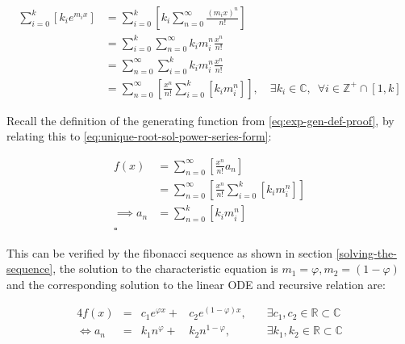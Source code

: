 \documentclass[11pt]{article}
\begin{document}
\begin{enumerate}
\begin{align}
    \sum^{k}_{i= 0}   {\left[{ k_i e^{m_i x}  }\right]}  &= \sum^{k}_{i= 0}   {\left[{ k_i \sum^{\infty}_{n= 0}   \frac{{\left({ m_i x }\right)}^n}{n!}  }\right]}  \nonumber \\
							 &= \sum^{k}_{i= 0}  \sum^{\infty}_{n= 0}   k_i m_i^n \frac{x^n}{n!} \nonumber\\
							 &=    \sum^{\infty}_{n= 0} \sum^{k}_{i= 0}   k_i m_i^n \frac{x^n}{n!} \nonumber \\
							 &= \sum^{\infty}_{n= 0} {\left[{ \frac{x^n}{n!}  \sum^{k}_{i=0}   {\left[{ k_im^n_i }\right]}  }\right]}, \quad \exists k_i \in \mathbb{C}, \enspace \forall i \in \mathbb{Z}^+\cap {\left[{ 1, k }\right]}     \label{eq:unique-root-sol-power-series-form}
\end{align}

Recall the definition of the generating function from \ref{eq:exp-gen-def-proof}, by relating this to \eqref{eq:unique-root-sol-power-series-form}:

\begin{align}
    f{\left({ x }\right)} &= \sum^{\infty}_{n= 0}   {\left[{  \frac{x^n}{n!} a_n }\right]} \nonumber \\
&= \sum^{\infty}_{n= 0} {\left[{ \frac{x^n}{n!}  \sum^{k}_{i=0}   {\left[{ k_im^n_i }\right]}  }\right]}  \nonumber \\
      \implies  a_n &= \sum^{k}_{n= 0} {\left[{ k_im_i^n }\right]}     \nonumber \\ \nonumber
\square
\end{align}

This can be verified by the fibonacci sequence as shown in section \ref{solving-the-sequence}, the solution to the characteristic equation is \(m_1 = \varphi, m_2 = {\left({ 1-\varphi }\right)}\) and the corresponding solution to the linear ODE and recursive relation are:

\begin{alignat}{4}
    f{\left({ x }\right)} &= &c_1 e^{\varphi x} +  &c_2 e^{{\left({ 1-\varphi }\right)} x}, \quad &\exists c_1, c_2 \in \mathbb{R} \subset \mathbb{C} \nonumber \\
    \iff  a_n &= &k_1 n^{\varphi} +  &k_2 n^{1- \varphi}, &\exists k_1, k_2 \in \mathbb{R} \subset \mathbb{C} \nonumber
\end{alignat}
\end{enumerate}
\end{document}
